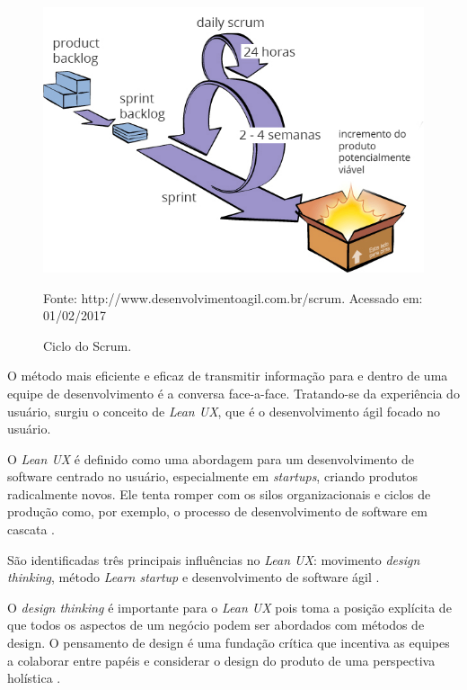 \begin{figure}[H]
\centering
\includegraphics[width=1\textwidth]{images/ciclos_scrum.jpg}
\caption{Ciclo do Scrum. }
\label{fig:cicloscrum}
{\small Fonte: http://www.desenvolvimentoagil.com.br/scrum. Acessado em: 01/02/2017} %
\end{figure}



O método mais eficiente e eficaz de transmitir informação para e dentro de uma equipe de desenvolvimento é a conversa face-a-face. Tratando-se da experiência do usuário, surgiu o conceito de \textit{Lean UX}, que é o desenvolvimento ágil focado no usuário.

O \textit{Lean UX} é definido como uma abordagem para um desenvolvimento de software centrado no usuário, especialmente em \textit{startups}, criando produtos radicalmente novos. Ele tenta romper com os silos organizacionais e ciclos de produção como, por exemplo, o processo de desenvolvimento de software em cascata \cite{Liikkanen:2014:LUN:2639189.2670285}. 

São identificadas três principais influências no \textit{Lean UX}: movimento \textit{design thinking}, método \textit{Learn startup} e desenvolvimento de software ágil \cite{gothelf2013lean}.

O \textit{design thinking} é importante para o \textit{Lean UX} pois toma a posição explícita de que todos os aspectos de um negócio podem ser abordados com métodos de design. O pensamento de design é uma fundação crítica que incentiva as equipes a colaborar entre papéis e considerar o design do produto de uma perspectiva holística \cite{robbinsd:beck2001agile}.

